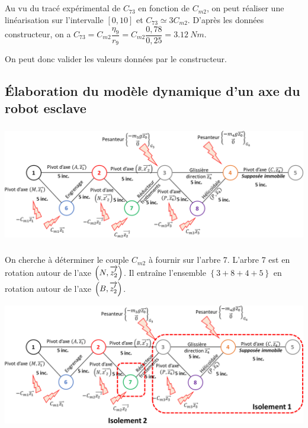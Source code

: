 \documentclass[10pt,fleqn]{article} %
\begin{document}
\subparagraph{}%
Au vu du tracé expérimental de $C_{73}$ en fonction de $C_{m2}$, on peut réaliser une linéarisation sur l'intervalle $[0,10]$ et $C_{73}\simeq 3 C_{m2}$. 
D'après les données constructeur, on a $C_{73}=C_{m2}\dfrac{\eta_9}{r_9}=C_{m2}\dfrac{0,78}{0,25}=\SI{3,12}{Nm}$.

On peut donc valider les valeurs données par le constructeur.
\subsection{Élaboration du modèle dynamique d’un axe du robot esclave}


\subparagraph{}%
\begin{center}
\includegraphics[width=\textwidth]{images/fig_02}
\end{center}
%
\subparagraph{}%
On cherche à déterminer le couple $C_{m2}$ à fournir sur l'arbre 7. L'arbre 7 est en rotation autour de l'axe $\left(N,\overrightarrow{z_2'}\right)$. Il entraîne l'ensemble $\left\{3+8+4+5\right\}$ en rotation autour de l'axe $\left(B,\overrightarrow{z_2'}\right)$.

\begin{center}
\includegraphics[width=\textwidth]{images/fig_05}
\end{center}
\end{document}
